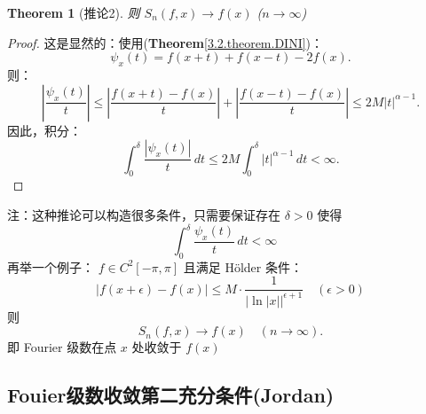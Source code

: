 \documentclass[linespread=1.5,openany]{book}%
\theoremstyle{plain}
\newtheorem{theorem}{Theorem}
\begin{document}
{{{{\begin{theorem}[推论2]
{								则 \( S_n(f, x) \to f(x) \) (\( n \to \infty \))}
						\end{theorem}
						\begin{proof}
							{这是显然的：使用(\textbf{Theorem}\ref{3.2.theorem.DINI})：\[	\psi_x(t) = f(x+t) + f(x-t) - 2f(x).	\]
								则：\[\left| \frac{\psi_x(t)}{t} \right| \leq \left| \frac{f(x+t) - f(x)}{t} \right| + \left| \frac{f(x-t) - f(x)}{t} \right| \leq 2M |t|^{\alpha - 1}.\]
								因此，积分：\[\int_0^\delta \frac{|\psi_x(t)|}{t} \, dt \leq 2M \int_0^\delta |t|^{\alpha - 1} \, dt < \infty.\]}
						\end{proof}
						注：这种推论可以构造很多条件，只需要保证存在 $\delta > 0$ 使得\[\int_{0}^{\delta} \frac{\psi_x(t)}{t} \, dt < \infty \quad \]
						再举一个例子： \( f \in C^2[-\pi, \pi] \) 且满足 Hölder 条件：\[
						|f(x+\epsilon) - f(x)| \leq M \cdot \frac{1}{\left|\ln|x|\right|^{\epsilon+1}} \quad (\epsilon > 0)\]则 
						\[S_n(f, x) \to f(x) \quad (n \to \infty).\]即 Fourier 级数在点 $x$ 处收敛于 $f(x)$
					}
					
					\subsection{Fouier级数收敛第二充分条件(Jordan)}{}
					
}}}
\end{document}
